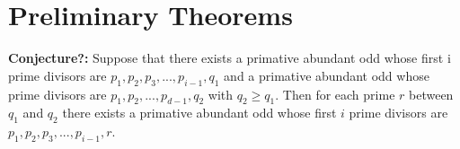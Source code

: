 \documentclass[../paper.tex]{subfiles}
\begin{document}
\section{Preliminary Theorems}



% 






\textbf{Conjecture?:} Suppose that there exists a primative abundant
odd whose first i prime divisors are $p_1, p_2, p_3, ..., p_{i-1}, 
q_1$ and a primative abundant odd whose prime divisors are $p_1, p_2, 
..., p_{d-1}, q_2$ with $q_2 \geq q_1$. Then for each prime $r$ 
between $q_1$ and $q_2$ there exists a primative abundant odd whose 
first $i$ prime divisors are $p_1, p_2, p_3, ..., p_{i-1}, r$.
\end{document}
